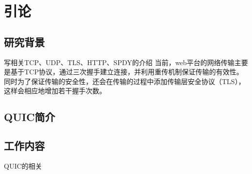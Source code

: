 \chapter{引论}

\label{cha:intro}

\section{研究背景}
写相关TCP、UDP、TLS、HTTP、SPDY的介绍
当前，web平台的网络传输主要是基于TCP协议，通过三次握手建立连接，并利用重传机制保证传输的有效性。同时为了保证传输的安全性，还会在传输的过程中添加传输层安全协议（TLS），这样会相应地增加若干握手次数。
\section{QUIC简介}

\section{工作内容}
QUIC的相关



